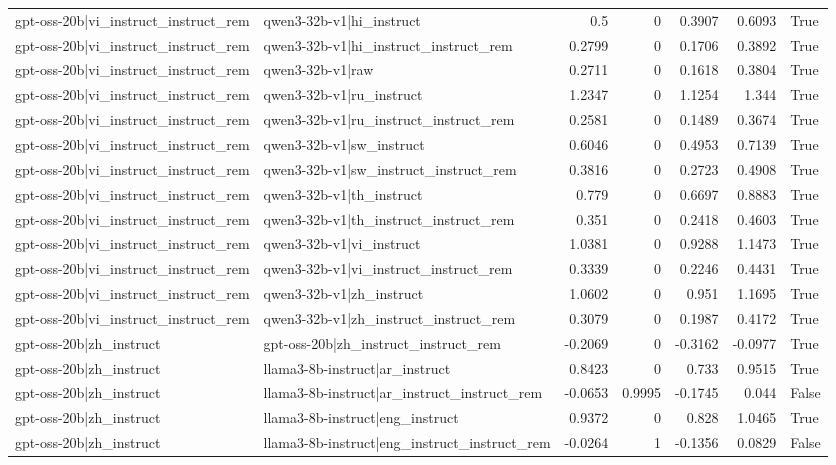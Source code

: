 \begin{table}
\begin{tabular}{l l r r r r l}
gpt-oss-20b|vi_instruct_instruct_rem & qwen3-32b-v1|hi_instruct & 0.5 & 0 & 0.3907 & 0.6093 & True \\
gpt-oss-20b|vi_instruct_instruct_rem & qwen3-32b-v1|hi_instruct_instruct_rem & 0.2799 & 0 & 0.1706 & 0.3892 & True \\
gpt-oss-20b|vi_instruct_instruct_rem & qwen3-32b-v1|raw & 0.2711 & 0 & 0.1618 & 0.3804 & True \\
gpt-oss-20b|vi_instruct_instruct_rem & qwen3-32b-v1|ru_instruct & 1.2347 & 0 & 1.1254 & 1.344 & True \\
gpt-oss-20b|vi_instruct_instruct_rem & qwen3-32b-v1|ru_instruct_instruct_rem & 0.2581 & 0 & 0.1489 & 0.3674 & True \\
gpt-oss-20b|vi_instruct_instruct_rem & qwen3-32b-v1|sw_instruct & 0.6046 & 0 & 0.4953 & 0.7139 & True \\
gpt-oss-20b|vi_instruct_instruct_rem & qwen3-32b-v1|sw_instruct_instruct_rem & 0.3816 & 0 & 0.2723 & 0.4908 & True \\
gpt-oss-20b|vi_instruct_instruct_rem & qwen3-32b-v1|th_instruct & 0.779 & 0 & 0.6697 & 0.8883 & True \\
gpt-oss-20b|vi_instruct_instruct_rem & qwen3-32b-v1|th_instruct_instruct_rem & 0.351 & 0 & 0.2418 & 0.4603 & True \\
gpt-oss-20b|vi_instruct_instruct_rem & qwen3-32b-v1|vi_instruct & 1.0381 & 0 & 0.9288 & 1.1473 & True \\
gpt-oss-20b|vi_instruct_instruct_rem & qwen3-32b-v1|vi_instruct_instruct_rem & 0.3339 & 0 & 0.2246 & 0.4431 & True \\
gpt-oss-20b|vi_instruct_instruct_rem & qwen3-32b-v1|zh_instruct & 1.0602 & 0 & 0.951 & 1.1695 & True \\
gpt-oss-20b|vi_instruct_instruct_rem & qwen3-32b-v1|zh_instruct_instruct_rem & 0.3079 & 0 & 0.1987 & 0.4172 & True \\
gpt-oss-20b|zh_instruct & gpt-oss-20b|zh_instruct_instruct_rem & -0.2069 & 0 & -0.3162 & -0.0977 & True \\
gpt-oss-20b|zh_instruct & llama3-8b-instruct|ar_instruct & 0.8423 & 0 & 0.733 & 0.9515 & True \\
gpt-oss-20b|zh_instruct & llama3-8b-instruct|ar_instruct_instruct_rem & -0.0653 & 0.9995 & -0.1745 & 0.044 & False \\
gpt-oss-20b|zh_instruct & llama3-8b-instruct|eng_instruct & 0.9372 & 0 & 0.828 & 1.0465 & True \\
gpt-oss-20b|zh_instruct & llama3-8b-instruct|eng_instruct_instruct_rem & -0.0264 & 1 & -0.1356 & 0.0829 & False \\

\end{tabular}
\end{table}
